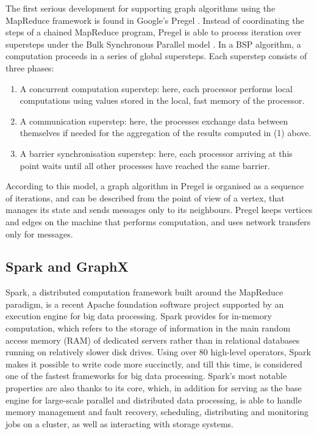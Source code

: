 The first serious development for supporting graph algorithms using the MapReduce framework is found in Google's Pregel \cite{Pregel}. Instead of coordinating the steps of a chained MapReduce program, Pregel is able to process iteration over supersteps under the Bulk Synchronous Parallel model \cite{Biss04, McColl2, Valiant}. In a BSP algorithm, a computation proceeds in a series of global supersteps. Each superstep consists of three phases:
\begin{enumerate}
\item{A concurrent computation superstep: here, each processor performs local computations using values stored in the local, fast memory of the processor.}
\item{A communication superstep: here, the processes exchange data between themselves if needed for the aggregation of the results computed in (1) above.}
\item{A barrier synchronisation superstep: here, each processor arriving at this point waits until all other processes have reached the same barrier.}
\end{enumerate}
According to this model, a graph algorithm in Pregel is organised as a sequence of iterations, and can be described from the point of view of a vertex, that manages its state and sends messages only to its neighbours. Pregel keeps vertices and edges on the machine that performs computation, and uses network transfers only for messages.

\subsection{Spark and GraphX}

Spark, a distributed computation framework built around the MapReduce paradigm, is a recent Apache foundation software project supported by an execution engine for big data processing. Spark provides for in-memory computation, which refers to the storage of information in the main random access memory (RAM) of dedicated servers rather than in relational databases running on relatively slower disk drives. Using over 80 high-level operators, Spark makes it possible to write code more succinctly, and till this time, is considered one of the fastest frameworks for big data processing. Spark's most notable properties are also thanks to its core, which, in addition for serving as the base engine for large-scale parallel and distributed data processing, is able to handle memory management and fault recovery, scheduling, distributing and monitoring jobs on a cluster, as well as interacting with storage systems.

